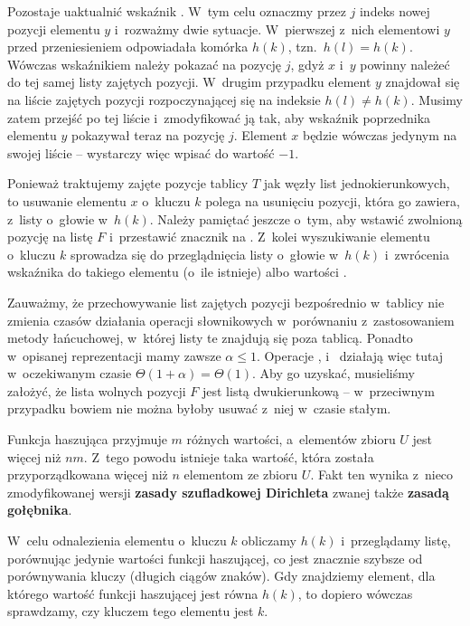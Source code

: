Pozostaje uaktualnić wskaźnik .
W~tym celu oznaczmy przez $j$ indeks nowej pozycji elementu $y$ i~rozważmy dwie sytuacje.
W~pierwszej z~nich elementowi $y$ przed przeniesieniem odpowiadała komórka $h(k)$, tzn.\ $h(l)=h(k)$.
Wówczas wskaźnikiem  należy pokazać na pozycję $j$, gdyż $x$ i~$y$ powinny należeć do tej samej listy zajętych pozycji.
W~drugim przypadku element $y$ znajdował się na liście zajętych pozycji rozpoczynającej się na indeksie $h(l)\ne h(k)$.
Musimy zatem przejść po tej liście i~zmodyfikować ją tak, aby wskaźnik  poprzednika elementu $y$ pokazywał teraz na pozycję $j$.
Element $x$ będzie wówczas jedynym na swojej liście -- wystarczy więc wpisać do  wartość $-1$.

Ponieważ traktujemy zajęte pozycje tablicy $T$ jak węzły list jednokierunkowych, to usuwanie elementu $x$ o~kluczu $k$ polega na usunięciu pozycji, która go zawiera, z~listy o~głowie w~$h(k)$.
Należy pamiętać jeszcze o~tym, aby wstawić zwolnioną pozycję na listę $F$ i~przestawić znacznik  na .
Z~kolei wyszukiwanie elementu o~kluczu $k$ sprowadza się do przeglądnięcia listy o~głowie w~$h(k)$ i~zwrócenia wskaźnika do takiego elementu (o~ile istnieje) albo wartości .

Zauważmy, że przechowywanie list zajętych pozycji bezpośrednio w~tablicy nie zmienia czasów działania operacji słownikowych w~porównaniu z~zastosowaniem metody łańcuchowej, w~której listy te znajdują się poza tablicą.
Ponadto w~opisanej reprezentacji mamy zawsze $\alpha\le1$.
Operacje ,  i~ działają więc tutaj w~oczekiwanym czasie $\Theta(1+\alpha)=\Theta(1)$.
Aby go uzyskać, musieliśmy założyć, że lista wolnych pozycji $F$ jest listą dwukierunkową -- w~przeciwnym przypadku bowiem nie można byłoby usuwać z~niej w~czasie stałym.

\exercise %
Funkcja haszująca przyjmuje $m$ różnych wartości, a~elementów zbioru $U$ jest więcej niż $nm$.
Z~tego powodu istnieje taka wartość, która została przyporządkowana więcej niż $n$ elementom ze zbioru $U$.
Fakt ten wynika z~nieco zmodyfikowanej wersji \textbf{zasady szufladkowej Dirichleta} \cite{pigeonholeprinciple} zwanej także \textbf{zasadą gołębnika}.


\exercise %
W~celu odnalezienia elementu o~kluczu $k$ obliczamy $h(k)$ i~przeglądamy listę, porównując jedynie wartości funkcji haszującej, co jest znacznie szybsze od porównywania kluczy (długich ciągów znaków).
Gdy znajdziemy element, dla którego wartość funkcji haszującej jest równa $h(k)$, to dopiero wówczas sprawdzamy, czy kluczem tego elementu jest $k$.

